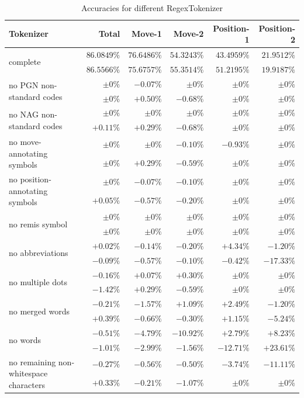 \documentclass[article,type=msc,colorback,accentcolor=tud7b]{tudthesis}
\begin{document}
	\begin{table}[H]
      \begin{tabular}{| l | r | r | r | r | r |}
    	\hline
    	Tokenizer & Total & Move-1 & Move-2 & Position-1 & Position-2 \\ \hline
	    \multirow{2}{*}{complete} & $86.0849\%$ & $76.6486\%$ & $54.3243\%$ & $43.4959\%$ & $21.9512\%$ \\	
	    & $86.5566\%$ & $75.6757\%$ & $55.3514\%$ & $51.2195\%$ & $19.9187\%$ \\ \hline
	    \multirow{2}{*}{no PGN non-standard codes} & $\pm0\%$ & $-0.07\%$ & $\pm0\%$ & $\pm0\%$ & $\pm0\%$ \\	
	    & $\pm0\%$ & $+0.50\%$ & $-0.68\%$ & $\pm0\%$ & $\pm0\%$ \\ \hline
	    \multirow{2}{*}{no NAG non-standard codes} & $\pm0\%$ & $\pm0\%$ & $\pm0\%$ & $\pm0\%$ & $\pm0\%$ \\	
	    & $+0.11\%$ & $+0.29\%$ & $-0.68\%$ & $\pm0\%$ & $\pm0\%$ \\ \hline
	    \multirow{2}{*}{no move-annotating symbols} & $\pm0\%$ & $\pm0\%$ & $-0.10\%$ & $-0.93\%$ & $\pm0\%$ \\	
	    & $\pm0\%$ & $+0.29\%$ & $-0.59\%$ & $\pm0\%$ & $\pm0\%$ \\ \hline
	    \multirow{2}{*}{no position-annotating symbols} & $\pm0\%$ & $-0.07\%$ & $-0.10\%$ & $\pm0\%$ & $\pm0\%$ \\	
	    & $+0.05\%$ & $-0.57\%$ & $-0.20\%$ & $\pm0\%$ & $\pm0\%$ \\ \hline
	    \multirow{2}{*}{no remis symbol} & $\pm0\%$ & $\pm0\%$ & $\pm0\%$ & $\pm0\%$ & $\pm0\%$ \\	
	    & $\pm0\%$ & $\pm0\%$ & $\pm0\%$ & $\pm0\%$ & $\pm0\%$ \\ \hline
	    \multirow{2}{*}{no abbreviations} & $+0.02\%$ & $-0.14\%$ & $-0.20\%$ & $+4.34\%$ & $-1.20\%$ \\	
	    & $-0.09\%$ & $-0.57\%$ & $-0.10\%$ & $-0.42\%$ & $-17.33\%$ \\ \hline
	    \multirow{2}{*}{no multiple dots} & $-0.16\%$ & $+0.07\%$ & $+0.30\%$ & $\pm0\%$ & $\pm0\%$ \\	
	    & $-1.42\%$ & $+0.29\%$ & $-0.59\%$ & $\pm0\%$ & $\pm0\%$ \\ \hline
	    \multirow{2}{*}{no merged words} & $-0.21\%$ & $-1.57\%$ & $+1.09\%$ & $+2.49\%$ & $-1.20\%$ \\	
	    & $+0.39\%$ & $-0.66\%$ & $-0.30\%$ & $+1.15\%$ & $-5.24\%$ \\ \hline
	    \multirow{2}{*}{no words} & $-0.51\%$ & $-4.79\%$ & $-10.92\%$ & $+2.79\%$ & $+8.23\%$ \\	
	    & $-1.01\%$ & $-2.99\%$ & $-1.56\%$ & $-12.71\%$ & $+23.61\%$ \\ \hline
	    \multirow{2}{*}{no remaining non-whitespace characters} & $-0.27\%$ & $-0.56\%$ & $-0.50\%$ & $-3.74\%$ & $-11.11\%$ \\	
	    & $+0.33\%$ & $-0.21\%$ & $-1.07\%$ & $\pm0\%$ & $\pm0\%$ \\ \hline
      \end{tabular}
      \caption{Accuracies for different RegexTokenizer}
      \label{tab:tokenizer_statistics}
	\end{table}
 
\end{document}
